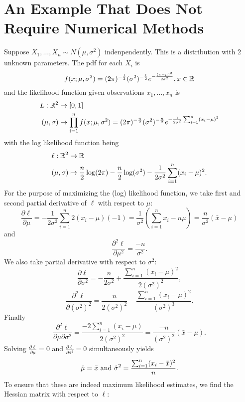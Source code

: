 \documentclass[11pt,fleqn]{book} %
\begin{document}

\section{An Example That Does Not Require Numerical Methods}

\begin{example} \label{eg:621}
Suppose \(X_1, \ldots, X_n \sim N(\mu, \sigma^2)\) indenpendently. This is a distribution with 2 unknown parameters. The pdf for each \(X_i\) is
\[
f(x; \mu, \sigma^2) = (2\pi)^{-\frac12}(\sigma^2)^{-\frac12}e^{-\frac{(x - \mu)^2}{2\sigma^2}}, x \in \mathbb{R}
\]
and the likelihood function given observations \(x_1, \ldots, x_n\) is
\[
\begin{aligned}
L: \mathbb{R}^2 &\rightarrow [0, 1] \\
(\mu, \sigma) &\mapsto \prod_{i=1}^n f(x; \mu, \sigma^2) = (2\pi)^{-\frac{n}{2}}(\sigma^2)^{-\frac{n}{2}}e^{-\frac{1}{2\sigma^2}\sum_{i=1}^n (x_i - \mu)^2}
\end{aligned}
\]
with the log likelihood function being
\[
\begin{aligned}
\ell: \mathbb{R}^2 &\rightarrow \mathbb{R} \\
(\mu, \sigma) &\mapsto \frac{n}{2}\log(2\pi) - \frac{n}{2}\log(\sigma^2) - \frac{1}{2\sigma^2}\sum_{i=1}^n (x_i - \mu)^2.
\end{aligned}
\]
\indent For the purpose of maximizing the (log) likelihood function, we take first and second partial derivative of \(\ell\) with respect to \(\mu\):
\[
\frac{\partial\ell}{\partial\mu} = -\frac{1}{2\sigma^2}\sum_{i=1}^n 2(x_i - \mu)(-1) = \frac{1}{\sigma^2}\left(\sum_{i=1}^n x_i - n\mu\right) = \frac{n}{\sigma^2}(\bar{x} - \mu)
\]
and
\[
\frac{\partial^2\ell}{\partial\mu^2} = \frac{-n}{\sigma^2}.
\]
\indent We also take partial derivative with respect to \(\sigma^2\):
\[
\frac{\partial\ell}{\partial\sigma^2} = -\frac{n}{2\sigma^2} + \frac{\sum_{i=1}^n(x_i - \mu)^2}{2(\sigma^2)^2},
\]
\[
\frac{\partial^2\ell}{\partial(\sigma^2)^2} = \frac{n}{2(\sigma^2)^2} - \frac{\sum_{i=1}^n (x_i - \mu)^2}{(\sigma^2)^3}.
\]
\indent Finally
\[
\frac{\partial^2\ell}{\partial\mu\partial\sigma^2} = \frac{-2\sum_{i=1}^n(x_i - \mu)}{2(\sigma^2)^2} = \frac{-n}{(\sigma^2)^2}(\bar{x} - \mu).
\]
\indent Solving \(\frac{\partial\ell}{\partial\mu} = 0\) and \(\frac{\partial\ell}{\partial\sigma^2} = 0\) simultaneously yields
\[
\hat{\mu} = \bar{x} \text{ and } \hat{\sigma}^2 = \frac{\sum_{i=1}^n(x_i - \bar{x})^2}{n}.
\]
\indent To ensure that these are indeed maximum likelihood estimates, we find the Hessian matrix with respect to \(\ell\):

\end{example}
\end{document}
